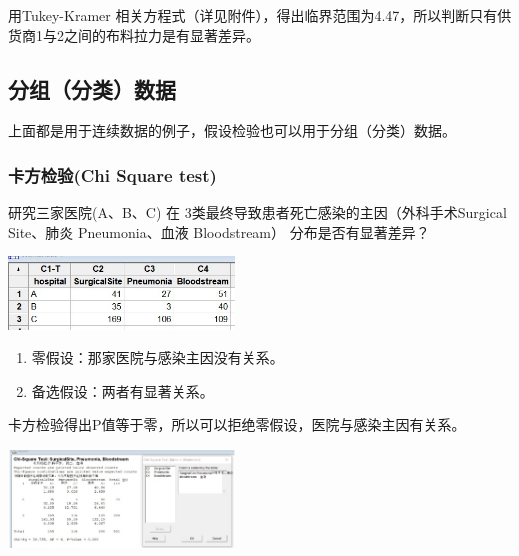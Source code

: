 用Tukey-Kramer
相关方程式（详见附件），得出临界范围为4.47，所以判断只有供货商1与2之间的布料拉力是有显著差异。

\hypertarget{ux65b9ux5deeux5206ux6790-anova-test}{%
\subsection{分组（分类）数据}\label{ux65b9ux5deeux5206ux6790-anova-test}}

上面都是用于连续数据的例子，假设检验也可以用于分组（分类）数据。

\hypertarget{ux5361ux65b9ux68c0ux9a8cchi-square-test}{%
\subsubsection{卡方检验(Chi Square
test)}\label{ux5361ux65b9ux68c0ux9a8cchi-square-test}}

研究三家医院(A、B、C) 在
3类最终导致患者死亡感染的主因（外科手术Surgical Site、肺炎
Pneumonia、血液 Bloodstream） 分布是否有显著差异？


\includegraphics[width=6cm]{4chiSquareDataScreenshot_2022-07-24_110053.jpg}

\begin{enumerate}
\tightlist
\item
  零假设：那家医院与感染主因没有关系。
\item
  备选假设：两者有显著关系。
\end{enumerate}

卡方检验得出P值等于零，所以可以拒绝零假设，医院与感染主因有关系。


\includegraphics[width=6cm]{6chiSquareTstResultScreenshot_2022-07-24_103606-1.jpg}

